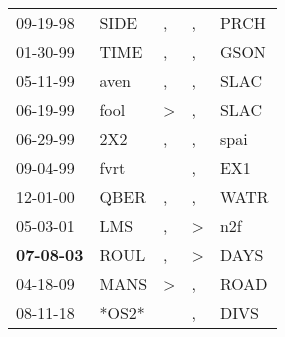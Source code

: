 \begin{supertabular}{p{0.07\textwidth}p{0.06\textwidth}p{0.02\textwidth}p{0.02\textwidth}p{0.06\textwidth}}
          09-19-98\textsuperscript{} &  SIDE\textsuperscript{} &             , &             , &  PRCH\textsuperscript{} \\
          01-30-99\textsuperscript{} &  TIME\textsuperscript{} &             , &             , &  GSON\textsuperscript{} \\
          05-11-99\textsuperscript{} &  aven\textsuperscript{} &             , &             , &  SLAC\textsuperscript{} \\
          06-19-99\textsuperscript{} &  fool\textsuperscript{} &  \textgreater &             , &  SLAC\textsuperscript{} \\
          06-29-99\textsuperscript{} &   2X2\textsuperscript{} &             , &             , &  spai\textsuperscript{} \\
          09-04-99\textsuperscript{} &  fvrt\textsuperscript{} &               &             , &   EX1\textsuperscript{} \\
          12-01-00\textsuperscript{} &  QBER\textsuperscript{} &             , &             , &  WATR\textsuperscript{} \\
          05-03-01\textsuperscript{} &   LMS\textsuperscript{} &             , &  \textgreater &   n2f\textsuperscript{} \\
 \textbf{07-08-03\textsuperscript{}} &  ROUL\textsuperscript{} &             , &  \textgreater &  DAYS\textsuperscript{} \\
          04-18-09\textsuperscript{} &  MANS\textsuperscript{} &  \textgreater &             , &  ROAD\textsuperscript{} \\
          08-11-18\textsuperscript{} &                   *OS2* &               &             , &  DIVS\textsuperscript{} \\
\end{supertabular}
